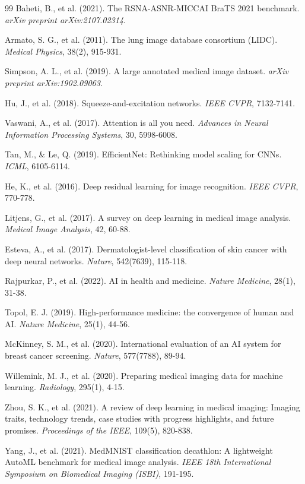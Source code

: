 \documentclass[12pt,a4paper]{article}
\begin{document}
\begin{thebibliography}{99}
Baheti, B., et al. (2021). The RSNA-ASNR-MICCAI BraTS 2021 benchmark. \textit{arXiv preprint arXiv:2107.02314}.

Armato, S. G., et al. (2011). The lung image database consortium (LIDC). \textit{Medical Physics}, 38(2), 915-931.

Simpson, A. L., et al. (2019). A large annotated medical image dataset. \textit{arXiv preprint arXiv:1902.09063}.

Hu, J., et al. (2018). Squeeze-and-excitation networks. \textit{IEEE CVPR}, 7132-7141.

Vaswani, A., et al. (2017). Attention is all you need. \textit{Advances in Neural Information Processing Systems}, 30, 5998-6008.

Tan, M., \& Le, Q. (2019). EfficientNet: Rethinking model scaling for CNNs. \textit{ICML}, 6105-6114.

He, K., et al. (2016). Deep residual learning for image recognition. \textit{IEEE CVPR}, 770-778.

Litjens, G., et al. (2017). A survey on deep learning in medical image analysis. \textit{Medical Image Analysis}, 42, 60-88.

Esteva, A., et al. (2017). Dermatologist-level classification of skin cancer with deep neural networks. \textit{Nature}, 542(7639), 115-118.

Rajpurkar, P., et al. (2022). AI in health and medicine. \textit{Nature Medicine}, 28(1), 31-38.

Topol, E. J. (2019). High-performance medicine: the convergence of human and AI. \textit{Nature Medicine}, 25(1), 44-56.

McKinney, S. M., et al. (2020). International evaluation of an AI system for breast cancer screening. \textit{Nature}, 577(7788), 89-94.

Willemink, M. J., et al. (2020). Preparing medical imaging data for machine learning. \textit{Radiology}, 295(1), 4-15.

Zhou, S. K., et al. (2021). A review of deep learning in medical imaging: Imaging traits, technology trends, case studies with progress highlights, and future promises. \textit{Proceedings of the IEEE}, 109(5), 820-838.

Yang, J., et al. (2021). MedMNIST classification decathlon: A lightweight AutoML benchmark for medical image analysis. \textit{IEEE 18th International Symposium on Biomedical Imaging (ISBI)}, 191-195.

\end{thebibliography}
\end{document}
